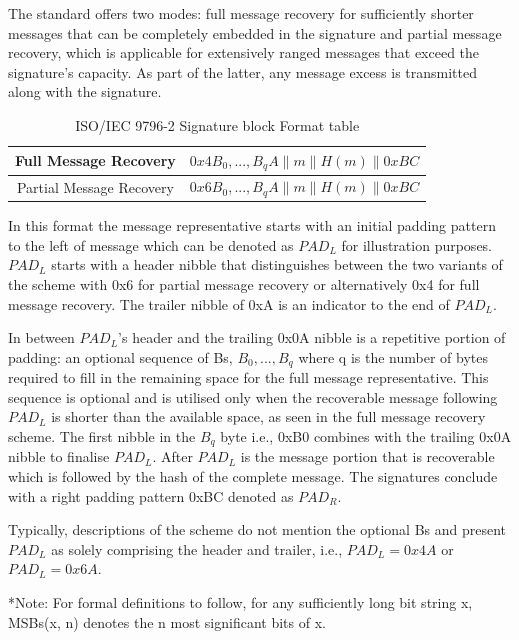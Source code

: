 \documentclass[]{final_report}
\theoremstyle{definition}
\begin{document}
The standard offers two modes: full message recovery for sufficiently shorter messages that can be completely embedded in the signature and partial message recovery, which is applicable for extensively ranged messages that exceed the signature's capacity. As part of the latter, any message excess is transmitted along with the signature.

\begin{table}[H]
    \centering
    \caption{ISO/IEC 9796-2 Signature block Format table}
    \begin{tabular}{|c|c|}
    \hline
    Full Message Recovery & $0x4B_{0},...,B_{q}A\|m\|H(m)\|0xBC$ \\
    \hline
    Partial Message Recovery & $0x6B_{0},...,B_{q}A\|m\|H(m)\|0xBC$ \\
    \hline
    \end{tabular}
    \label{tab:sig_block_tab}
\end{table}
In this format the message representative starts with an initial padding pattern to the left of message which can be denoted as $PAD_L$ for illustration purposes. $PAD_L$ starts with a header nibble that distinguishes between the two variants of the scheme with 0x6 for partial message recovery or alternatively 0x4 for full message recovery. The trailer nibble of 0xA is an indicator to the end of $PAD_L$. 

In between $PAD_L$'s header and the trailing 0x0A nibble is a repetitive portion of padding: an optional sequence of Bs, $B_{0},...,B_{q}$ where q is the number of bytes required to fill in the remaining space for the full message representative. This sequence is optional and is utilised only when the recoverable message following $PAD_L$ is shorter than the available space, as seen in the full message recovery scheme. The first nibble in the $B_{q}$ byte i.e., 0xB0 combines with the trailing 0x0A nibble to finalise $PAD_L$.
After $PAD_L$ is the message portion that is recoverable which is followed by the hash of the complete message. The signatures conclude with a right padding pattern 0xBC denoted as $PAD_R$.

Typically, descriptions of the scheme do not mention the optional Bs and present $PAD_L$ as solely comprising the header and trailer, i.e., $PAD_L = 0x4A$ or $PAD_L = 0x6A$.

*Note: For formal definitions to follow, for any sufficiently long bit string x, MSBs(x, n) denotes the n most significant bits of x.
\end{document}

